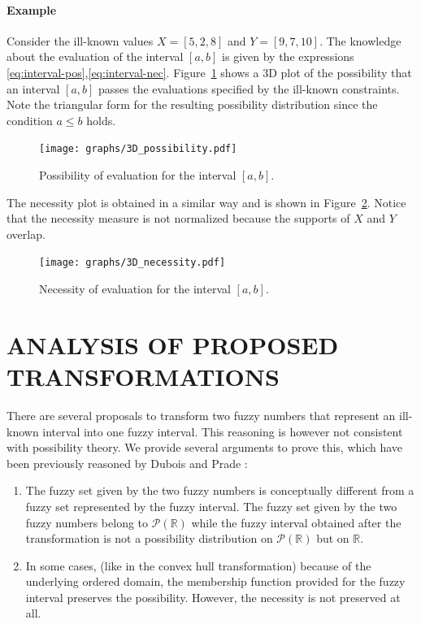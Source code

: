 \documentclass[twoside,twocolumn,a4paper]{article}
\newcommand{\Pow}{\mathcal{P}}
\begin{document}
\paragraph{Example} Consider the ill-known values $X = \left[5, 2, 8\right]$ and $Y = \left[9, 7, 10 \right]$. The knowledge about the evaluation of the interval $\left[a, b \right]$  is given by the expressions \eqref{eq:interval-pos},\eqref{eq:interval-nec}.  Figure~\ref{fig:3d-possibility} shows a 3D plot of the possibility that an interval $[a,b]$ passes the evaluations specified by the ill-known constraints. Note the triangular form for the resulting possibility distribution since the condition $a \leq b$ holds.

\begin{figure}[h!]
\centering
\texttt{[image: graphs/3D\_possibility.pdf]}
\caption{Possibility of evaluation for the interval $[a,b]$.}
\label{fig:3d-possibility}
\end{figure}
The necessity plot is obtained in a similar way and is shown in Figure~\ref{fig:3d-necessity}. Notice that the necessity measure is not normalized because the supports of $X$ and $Y$ overlap.
\begin{figure}[h!]
\centering
\texttt{[image: graphs/3D\_necessity.pdf]}
\caption{Necessity of evaluation for the interval $[a,b]$.}
\label{fig:3d-necessity}
\end{figure}


\section{\label{sec:analysis}ANALYSIS OF PROPOSED TRANSFORMATIONS}

There are several proposals to transform two fuzzy numbers that represent an ill-known interval into one fuzzy interval. This reasoning is however not consistent with possibility theory. We provide several arguments to prove this, which have been previously reasoned by Dubois and Prade \cite{Dubois88b}:

\begin{enumerate}
\item
The fuzzy set given by the two fuzzy numbers is conceptually different from a fuzzy set represented by the fuzzy interval. The fuzzy set given by the two fuzzy numbers belong to $\Pow(\mathbb{R})$ while the fuzzy interval obtained after the transformation is not a possibility distribution on $\Pow(\mathbb{R})$  but on $\mathbb{R}$.
\item
In some cases, (like in the convex hull transformation) because of the underlying ordered domain, the membership function provided for the fuzzy interval preserves the possibility. However, the necessity is not preserved at all.
\end{enumerate}
\end{document}
